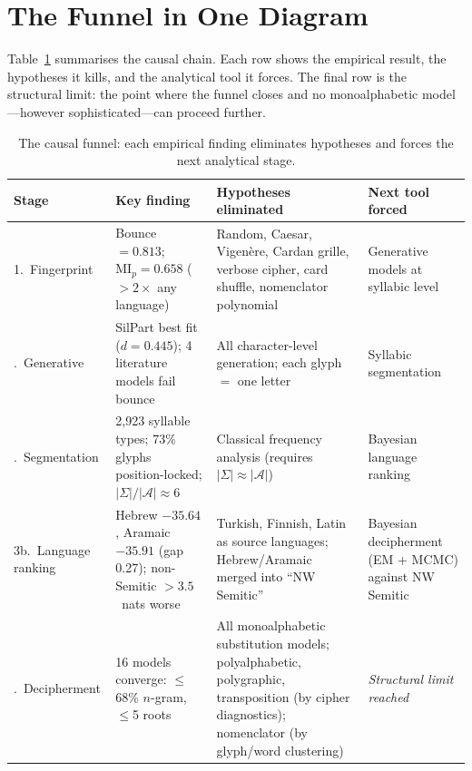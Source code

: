 \documentclass[11pt,a4paper]{article}
\newcommand{\MI}{\mathrm{MI}}
\begin{document}
\section{The Funnel in One Diagram}

Table~\ref{tab:funnel} summarises the causal chain.  Each row shows the empirical result, the hypotheses it kills, and the analytical tool it forces.  The final row is the structural limit: the point where the funnel closes and no monoalphabetic model---however sophisticated---can proceed further.

\begin{table}[t]
\caption{The causal funnel: each empirical finding eliminates hypotheses and forces the next analytical stage.}
\label{tab:funnel}
\centering
\begin{tabular*}{\textwidth}{@{\extracolsep\fill}p{2.8cm}p{4.5cm}p{4.5cm}p{3.5cm}@{}}
\toprule
\textbf{Stage} & \textbf{Key finding} & \textbf{Hypotheses eliminated} & \textbf{Next tool forced} \\
\midrule
1.\ Fingerprint &
  Bounce $= 0.813$; $\MI_p = 0.658$ (${>}2\times$ any language) &
  Random, Caesar, Vigen\`ere, Cardan grille, verbose cipher, card shuffle, nomenclator polynomial &
  Generative models at syllabic level \\
\addlinespace
2.\ Generative &
  SilPart best fit ($d = 0.445$); 4 literature models fail bounce &
  All character-level generation; each glyph $=$ one letter &
  Syllabic segmentation \\
\addlinespace
3.\ Segmentation &
  2,923 syllable types; 73\% glyphs position-locked; $|\Sigma|/|\mathcal{A}| \approx 6$ &
  Classical frequency analysis (requires $|\Sigma| \approx |\mathcal{A}|$) &
  Bayesian language ranking \\
\addlinespace
3b.\ Language ranking &
  Hebrew $-35.64$, Aramaic $-35.91$ (gap 0.27); non-Semitic ${>}3.5$~nats worse &
  Turkish, Finnish, Latin as source languages; Hebrew/Aramaic merged into ``NW Semitic'' &
  Bayesian decipherment (EM + MCMC) against NW Semitic \\
\addlinespace
4.\ Decipherment &
  16 models converge: $\leq$68\% $n$-gram, $\leq$5 roots &
  All monoalphabetic substitution models; polyalphabetic, polygraphic, transposition (by cipher diagnostics); nomenclator (by glyph/word clustering) &
  \textit{Structural limit reached} \\
\bottomrule
\end{tabular*}
\end{table}
\end{document}
